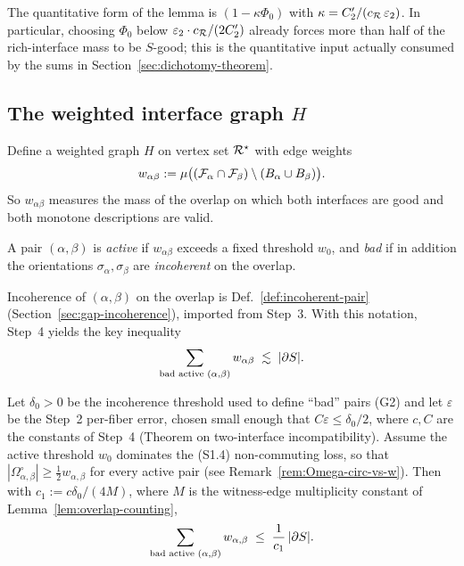 \begin{remark}
The quantitative form of the lemma is $(1-\kappa\Phi_0)$ with
$\kappa = C_2'/(c_{\mathcal{R}}\,\varepsilon_2)$.  In particular, choosing
$\Phi_0$ below $\varepsilon_2 \cdot c_{\mathcal{R}}/(2 C_2')$ already forces
more than half of the rich-interface mass to be $S$-good; this is the
quantitative input actually consumed by the sums in
Section~\ref{sec:dichotomy-theorem}.
\end{remark}

\subsection{The weighted interface graph $H$}

Define a weighted graph $H$ on vertex set $\mathcal{R}^\star$ with edge weights
\[
w_{\alpha\beta}
 := \mu\big((\mathcal{F}_{\alpha}\cap\mathcal{F}_{\beta})
        \setminus (B_\alpha\cup B_\beta)\big).
\]
So $w_{\alpha\beta}$ measures the mass of the overlap on which both
interfaces are good and both monotone descriptions are valid.

\begin{definition}
A pair $(\alpha,\beta)$ is \emph{active} if $w_{\alpha\beta}$ exceeds a
fixed threshold $w_0$, and \emph{bad} if in addition the orientations
$\sigma_\alpha,\sigma_\beta$ are \emph{incoherent} on the overlap.
\end{definition}

Incoherence of $(\alpha,\beta)$ on the overlap is
Def.~\ref{def:incoherent-pair} (Section~\ref{sec:gap-incoherence}),
imported from Step~3.
With this notation, Step~4 yields the key inequality
\begin{equation}\label{eq:bad-bounded-by-boundary}
\sum_{\text{bad active }(\alpha,\beta)} w_{\alpha\beta}
\;\lesssim\; |\partial S|.
\end{equation}

\begin{lemma}\label{lem:sum-step4}
Let $\delta_0>0$ be the incoherence threshold used to define ``bad''
pairs (G2) and let $\varepsilon$ be the Step~2 per-fiber error, chosen
small enough that $C\varepsilon\le\delta_0/2$, where $c,C$ are the
constants of Step~4 (Theorem on two-interface incompatibility).
Assume the active threshold $w_0$ dominates the (S1.4) non-commuting
loss, so that
$|\Omega^\circ_{\alpha,\beta}|\ge\tfrac12 w_{\alpha,\beta}$ for every
active pair (see Remark~\ref{rem:Omega-circ-vs-w}).
Then with $c_1:=c\delta_0/(4M)$, where $M$ is the witness-edge
multiplicity constant of Lemma~\ref{lem:overlap-counting},
\begin{equation}\label{eq:bad-bounded-by-boundary-quant}
\sum_{\text{bad active }(\alpha,\beta)}
w_{\alpha,\beta}\;\le\;\frac{1}{c_1}\,|\partial S|.
\end{equation}
\end{lemma}

